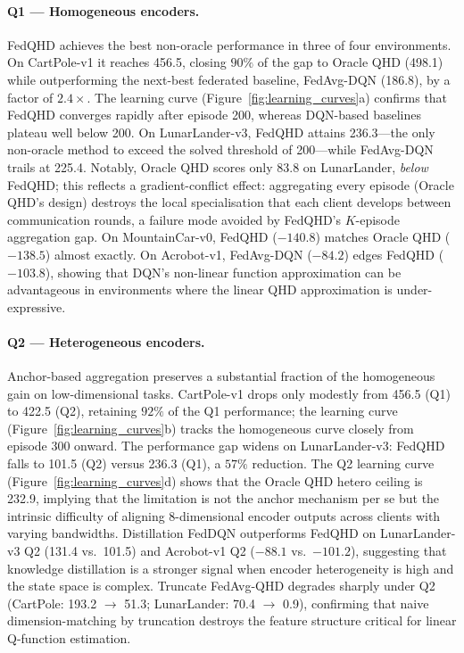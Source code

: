 \paragraph{Q1 — Homogeneous encoders.}
FedQHD achieves the best non-oracle performance in three of four environments.
On CartPole-v1 it reaches 456.5, closing $90\%$ of the gap to Oracle QHD (498.1) while outperforming the next-best federated baseline, FedAvg-DQN (186.8), by a factor of $2.4\times$.
The learning curve (Figure~\ref{fig:learning_curves}a) confirms that FedQHD converges rapidly after episode 200, whereas DQN-based baselines plateau well below 200.
On LunarLander-v3, FedQHD attains 236.3---the only non-oracle method to exceed the solved threshold of 200---while FedAvg-DQN trails at 225.4.
Notably, Oracle QHD scores only 83.8 on LunarLander, \emph{below} FedQHD; this reflects a gradient-conflict effect: aggregating every episode (Oracle QHD's design) destroys the local specialisation that each client develops between communication rounds, a failure mode avoided by FedQHD's $K$-episode aggregation gap.
On MountainCar-v0, FedQHD ($-140.8$) matches Oracle QHD ($-138.5$) almost exactly.
On Acrobot-v1, FedAvg-DQN ($-84.2$) edges FedQHD ($-103.8$), showing that DQN's non-linear function approximation can be advantageous in environments where the linear QHD approximation is under-expressive.

\paragraph{Q2 — Heterogeneous encoders.}
Anchor-based aggregation preserves a substantial fraction of the homogeneous gain on low-dimensional tasks.
CartPole-v1 drops only modestly from 456.5 (Q1) to 422.5 (Q2), retaining $92\%$ of the Q1 performance; the learning curve (Figure~\ref{fig:learning_curves}b) tracks the homogeneous curve closely from episode 300 onward.
The performance gap widens on LunarLander-v3: FedQHD falls to 101.5 (Q2) versus 236.3 (Q1), a $57\%$ reduction.
The Q2 learning curve (Figure~\ref{fig:learning_curves}d) shows that the Oracle QHD hetero ceiling is 232.9, implying that the limitation is not the anchor mechanism per se but the intrinsic difficulty of aligning 8-dimensional encoder outputs across clients with varying bandwidths.
Distillation FedDQN outperforms FedQHD on LunarLander-v3 Q2 (131.4 vs.\ 101.5) and Acrobot-v1 Q2 ($-88.1$ vs.\ $-101.2$), suggesting that knowledge distillation is a stronger signal when encoder heterogeneity is high and the state space is complex.
Truncate FedAvg-QHD degrades sharply under Q2 (CartPole: 193.2 $\to$ 51.3; LunarLander: 70.4 $\to$ 0.9), confirming that naive dimension-matching by truncation destroys the feature structure critical for linear Q-function estimation.

